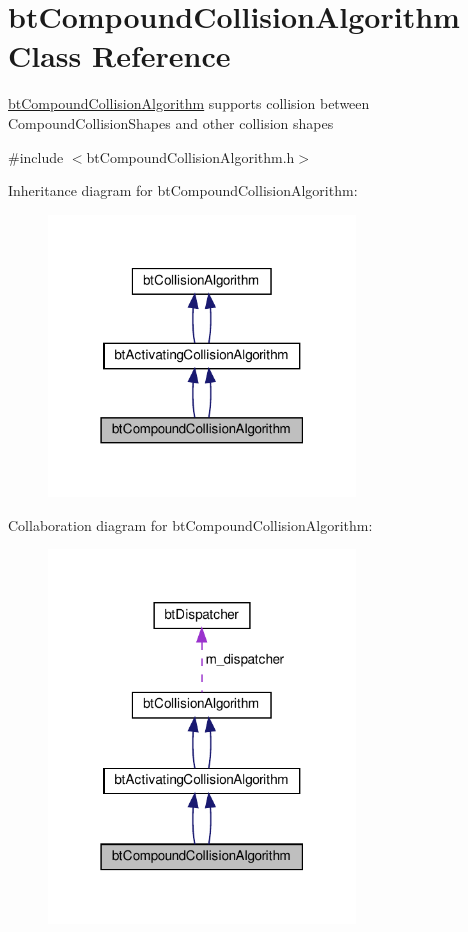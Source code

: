 \hypertarget{classbtCompoundCollisionAlgorithm}{}\section{bt\+Compound\+Collision\+Algorithm Class Reference}
\label{classbtCompoundCollisionAlgorithm}


\hyperlink{classbtCompoundCollisionAlgorithm}{bt\+Compound\+Collision\+Algorithm} supports collision between Compound\+Collision\+Shapes and other collision shapes  




{\ttfamily \#include $<$bt\+Compound\+Collision\+Algorithm.\+h$>$}



Inheritance diagram for bt\+Compound\+Collision\+Algorithm\+:
\nopagebreak
\begin{figure}[H]
\begin{center}
\leavevmode
\includegraphics[width=231pt]{classbtCompoundCollisionAlgorithm__inherit__graph}
\end{center}
\end{figure}


Collaboration diagram for bt\+Compound\+Collision\+Algorithm\+:
\nopagebreak
\begin{figure}[H]
\begin{center}
\leavevmode
\includegraphics[width=231pt]{classbtCompoundCollisionAlgorithm__coll__graph}
\end{center}
\end{figure}
